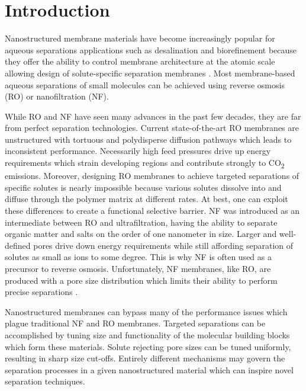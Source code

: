 \section*{Introduction}

Nanostructured membrane materials have become increasingly popular for 
aqueous separations applications such as desalination and biorefinement
because they offer the ability to control membrane architecture at the
atomic scale allowing design of solute-specific separation membranes 
\cite{humplik_nanostructured_2011}. Most membrane-based aqueous 
separations of small molecules can be achieved using reverse osmosis 
(RO) or nanofiltration (NF)\cite{van_der_bruggen_review_2003}. 

While RO and NF have seen many advances in the past few decades, they 
are far from perfect separation technologies. Current state-of-the-art
RO membranes are unstructured with tortuous and polydisperse diffusion
pathways which leads to inconsistent performance\cite{song_nano_2011}.
Necessarily high feed pressures drive up energy requirements which 
strain developing regions and contribute strongly to CO\textsubscript{2} 
emissions\cite{mcginnis_global_2008}. Moreover, designing RO 
membranes to achieve targeted separations of specific solutes is nearly
impossible because various solutes dissolve into and diffuse through the polymer
matrix at different rates\cite{wijmans_solution-diffusion_1995}. At best,
one can exploit these differences to create a functional selective 
barrier. NF was introduced as an intermediate between RO and 
ultrafiltration, having the ability to separate organic matter and salts
on the order of one nanometer in size. Larger and well-defined pores 
drive down energy requirements while still affording separation of 
solutes as small as ions to some degree\cite{van_der_bruggen_review_2003}.
This is why NF is often used as a precursor to reverse osmosis. 
Unfortunately, NF membranes, like RO, are produced with a pore size 
distribution which limits their ability to perform precise separations
\cite{bowen_modelling_2002}.

Nanostructured membranes can bypass many of the performance issues which
plague traditional NF and RO membranes. Targeted separations can be 
accomplished by tuning size and functionality of the molecular building
blocks which form these materials. Solute rejecting pore sizes can be
tuned uniformly, resulting in sharp size cut-offs. Entirely different
mechanisms may govern the separation processes in a given nanostructured
material which can inspire novel separation techniques.
	
